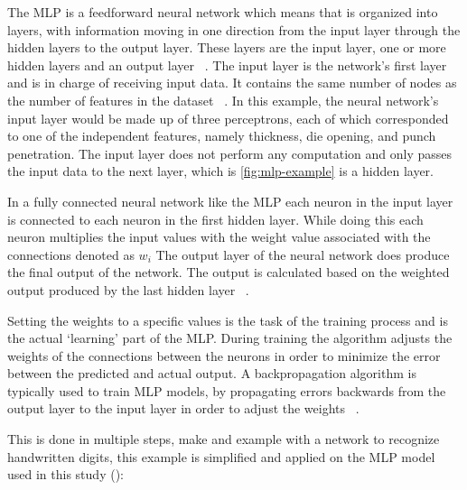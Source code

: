 The MLP is a feedforward neural network which means that is organized into layers, with information
moving in one direction from the input layer through the hidden layers to the output
layer.
These layers are the input layer, one or more hidden layers and an output
layer
~\cite[pp. 279--280]{bishop1995neural}.
The input layer is the network's first layer and is in charge of receiving input data.
It contains the same number of nodes as the number of features in the dataset
~\cite[p. 105]{muller2016introduction}.
In this example, the neural network's input layer would be made up of three perceptrons, each of which corresponded
to one of the independent features, namely thickness, die opening, and punch penetration.
The input layer does not perform any computation and only passes the input data to the next layer, which is
\cref{fig:mlp-example} is a hidden layer.

In a fully connected neural network like the MLP each neuron in the input layer is connected to each neuron in the
first hidden layer.
While doing this each neuron multiplies the input values with the weight value associated with the connections
denoted as $w_i$
The output layer of the neural network does produce the final output of the network.
The output is calculated based on the weighted output produced by the last hidden layer
~\cite[p. 106]{muller2016introduction}.

Setting the weights to a specific values is the task of the training process and is the actual `learning' part of the
MLP.
During training the algorithm adjusts the weights of the connections between the neurons in order to minimize
the error between the predicted and actual output.
A backpropagation algorithm is typically used to train \ac{MLP} models, by
propagating errors backwards from the output layer to the input layer in order to adjust
the weights
~\cite[p. 454]{taud2018multilayer}.

This is done in multiple steps, \cite{nielsen2015neural} make and example with a network to recognize
handwritten digits, this example is simplified and applied on the MLP model used in this study
(\cite[p. 12--24]{nielsen2015neural}):

